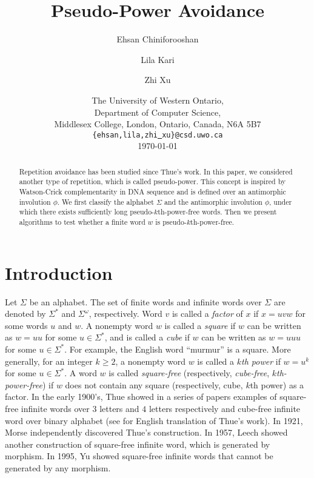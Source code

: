\documentclass[12pt]{article}
\title{Pseudo-Power Avoidance}
\author{Ehsan Chiniforooshan \and Lila Kari \and Zhi Xu}
\date{The University of Western Ontario, \\
Department of Computer Science, \\
Middlesex College, London, Ontario, Canada, N6A 5B7 \\
{\tt \{ehsan,lila,zhi\underline{ }xu\}@csd.uwo.ca} \\
\medskip \today}
\begin{document}
\maketitle


\begin{abstract}
Repetition avoidance has been studied since Thue's work. In this
paper, we considered another type of repetition, which is called
pseudo-power. This concept is inspired by Watson-Crick
complementarity in DNA sequence and is defined over an antimorphic
involution $\phi$. We first classify the alphabet $\Sigma$ and the
antimorphic involution $\phi$, under which there exists sufficiently
long pseudo-$k$th-power-free words. Then we present algorithms to
test whether a finite word $w$ is pseudo-$k$th-power-free.
\end{abstract}


\section{Introduction}\label{section:introduction}
Let $\Sigma$ be an alphabet. The set of finite words and infinite
words over $\Sigma$ are denoted by $\Sigma^*$ and $\Sigma^\omega$,
respectively. Word $v$ is called a \emph{factor} of $x$ if $x=uvw$
for some words $u$ and $w$. A nonempty word $w$ is called a
\emph{square} if $w$ can be written as $w=uu$ for some
$u\in\Sigma^*$, and is called a \emph{cube} if $w$ can be written as
$w=uuu$ for some $u\in\Sigma^*$. For example, the English word
``murmur'' is a square. More generally, for an integer $k\geq 2$, a
nonempty word $w$ is called a \emph{$k$th power} if $w=u^k$ for some
$u\in\Sigma^*$. A word $w$ is called \emph{square-free}
(respectively, \emph{cube-free}, \emph{$k$th-power-free}) if $w$
does not contain any square (respectively, cube, $k$th power) as a
factor. In the early 1900's, Thue showed in a series of papers
examples of square-free infinite words over $3$ letters and $4$
letters respectively and cube-free infinite word over binary
alphabet \cite{Thue1906,Thue1912} (see \cite{Berstel1995} for
English translation of Thue's work). In 1921, Morse \cite{Morse1921}
independently discovered Thue's construction. In 1957, Leech
\cite{Leech1957} showed another construction of square-free infinite
word, which is generated by morphism. In 1995, Yu \cite{Yu1995}
showed square-free infinite words that cannot be generated by any
morphism.
\end{document}
